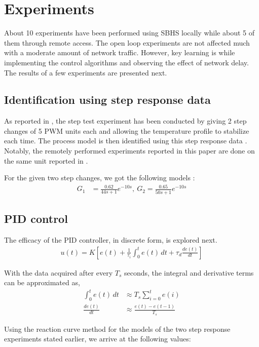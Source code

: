 \section{Experiments}
\label{sec:expts}
About 10 experiments have been performed using SBHS locally while about 5 of them through remote access.  The open loop experiments are not affected much with a moderate amount of network traffic.  However, key learning is while implementing the control algorithms and observing the effect of network delay.  The results of a few experiments are presented next.

\subsection{Identification using step response data}
As reported in \cite{ia010}, the step test experiment has been conducted by giving 2 step changes of 5 PWM units each and allowing the temperature profile to stabilize each time.  The process model is then identified using this step response data
\cite{karl95,seborg04}. Notably, the remotely performed experiments reported in this paper are done on the same unit reported in \cite{ia010}.  

For the given two step changes, we got the following models \cite{ia010}:
\begin{align*}
G_1 &= \frac{0.62}{44s + 1}e^{-10s}, \ 
G_2 = \frac{0.65}{50s + 1}e^{-10s}
\end{align*}


\subsection{PID control}
The efficacy of the PID controller, in discrete form, is explored next.
\begin{align}
u(t) = K\left[e(t) + \frac{1}{\tau_i} \int_0^t e(t)\,dt + \tau_d
  \frac{de(t)}{dt}\right] 
\end{align}

With the data acquired after every $T_s$ seconds, the integral and derivative terms can be approximated as,
\begin{align}
\int_0^t e(t)\,dt & \approx T_s \sum_{i=0}^{t} e(i) \\ 
\frac{de(t)}{dt} & \approx \frac{e(t) - e(t-1)}{T_s} 
 \end{align}

Using the reaction curve method for the models of the two step response experiments stated earlier,  we arrive at the following values: 

